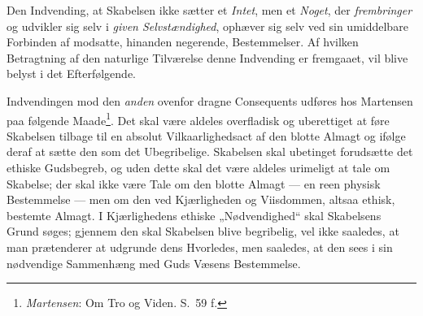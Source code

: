 \documentclass[12pt,a4paper]{book}
\begin{document}
Den Indvending, at Skabelsen ikke sætter et \emph{Intet}, men et \emph{Noget}, der
\emph{frembringer} og udvikler sig selv i \emph{given Selvstændighed}, ophæver sig
selv ved sin umiddelbare Forbinden af modsatte, hinanden negerende, Bestemmelser. Af
hvilken Betragtning af den naturlige Tilværelse denne Indvending er fremgaaet, vil
blive belyst i det Efterfølgende.

Indvendingen mod den \emph{anden} ovenfor dragne Consequents udføres hos Martensen
paa følgende Maade\footnote{\emph{Martensen}: Om Tro og Viden. S.\ 59 f.}. Det skal være
aldeles overfladisk og uberettiget at føre Skabelsen tilbage til en absolut
Vilkaarlighedsact af den blotte Almagt og ifølge deraf at sætte den som det
Ubegribelige. Skabelsen skal ubetinget forudsætte det ethiske Gudsbegreb, og uden
dette skal det være aldeles urimeligt at tale om Skabelse; der skal ikke være Tale
om den blotte Almagt --- en reen physisk Bestemmelse --- men om den ved Kjærligheden
og Viisdommen, altsaa ethisk, bestemte Almagt. I Kjærlighedens ethiske „Nødvendighed“
skal Skabelsens Grund søges; gjennem den skal Skabelsen blive begribelig, vel ikke
saaledes, at man prætenderer at udgrunde dens Hvorledes, men saaledes, at den sees i
sin nødvendige Sammenhæng med Guds Væsens Bestemmelse.
\end{document}
